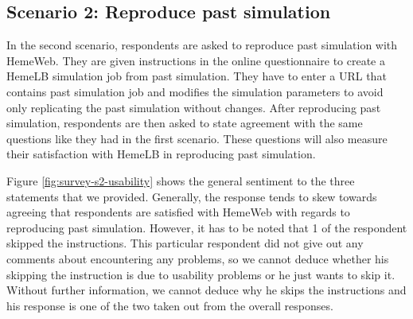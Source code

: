 \subsection{Scenario 2: Reproduce past simulation}

In the second scenario, respondents are asked to reproduce past simulation with HemeWeb. They are given instructions in the online questionnaire to create a HemeLB simulation job from past simulation. They have to enter a URL that contains past simulation job and modifies the simulation parameters to avoid only replicating the past simulation without changes. After reproducing past simulation, respondents are then asked to state agreement with the same questions like they had in the first scenario. These questions will also measure their satisfaction with HemeLB in reproducing past simulation.


\vspace{0.5cm}

\noindent%
\begin{minipage}{\linewidth}%
 \label{fig:survey-s2-usability}%
\end{minipage}
\vspace{0.5cm}

Figure \ref{fig:survey-s2-usability} shows the general sentiment to the three statements that we provided. Generally, the response tends to skew towards agreeing that respondents are satisfied with HemeWeb with regards to reproducing past simulation. However, it has to be noted that 1 of the respondent skipped the instructions. This particular respondent did not give out any comments about encountering any problems, so we cannot deduce whether his skipping the instruction is due to usability problems or he just wants to skip it. Without further information, we cannot deduce why he skips the instructions and his response is one of the two taken out from the overall responses.

